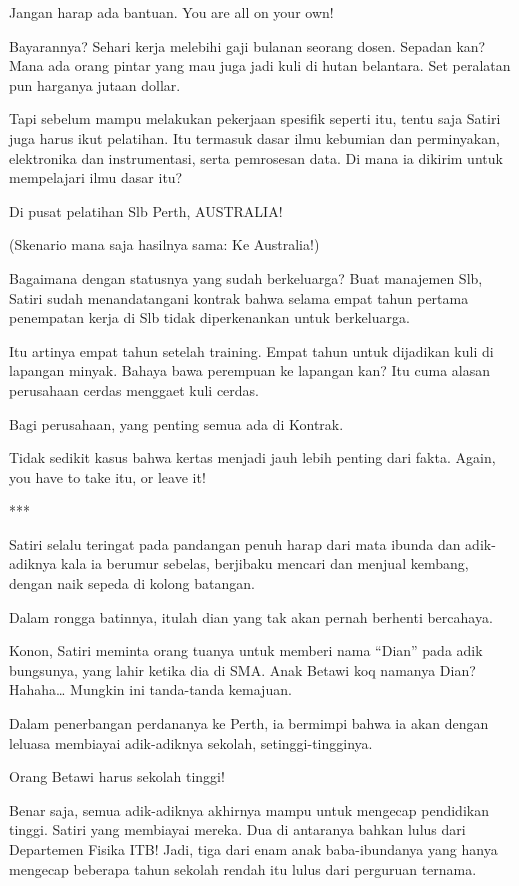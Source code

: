 Jangan harap ada bantuan. You are all on your own!

Bayarannya? Sehari kerja melebihi gaji bulanan seorang dosen. Sepadan kan? Mana ada orang pintar yang mau juga jadi kuli di hutan belantara. Set peralatan pun harganya jutaan dollar.

Tapi sebelum mampu melakukan pekerjaan spesifik seperti itu, tentu saja Satiri juga harus ikut pelatihan. Itu termasuk dasar ilmu kebumian dan perminyakan, elektronika dan instrumentasi, serta pemrosesan data. Di mana ia dikirim untuk mempelajari ilmu dasar itu?

Di pusat pelatihan Slb Perth, AUSTRALIA!

(Skenario mana saja hasilnya sama: Ke Australia!)

Bagaimana dengan statusnya yang sudah berkeluarga? Buat manajemen Slb, Satiri sudah menandatangani kontrak bahwa selama empat tahun pertama penempatan kerja di Slb tidak diperkenankan untuk berkeluarga.

Itu artinya empat tahun setelah training. Empat tahun untuk dijadikan kuli di lapangan minyak. Bahaya bawa perempuan ke lapangan kan? Itu cuma alasan perusahaan cerdas menggaet kuli cerdas.

Bagi perusahaan, yang penting semua ada di Kontrak.

Tidak sedikit kasus bahwa kertas menjadi jauh lebih penting dari fakta. Again, you have to take itu, or leave it!

***

Satiri selalu teringat pada pandangan penuh harap dari mata ibunda dan adik-adiknya kala ia berumur sebelas, berjibaku mencari dan menjual kembang, dengan naik sepeda di kolong batangan.

Dalam rongga batinnya, itulah dian yang tak akan pernah berhenti bercahaya.

Konon, Satiri meminta orang tuanya untuk memberi nama “Dian” pada adik bungsunya, yang lahir ketika dia di SMA. Anak Betawi koq namanya Dian? Hahaha… Mungkin ini tanda-tanda kemajuan.

Dalam penerbangan perdananya ke Perth, ia bermimpi bahwa ia akan dengan leluasa membiayai adik-adiknya sekolah, setinggi-tingginya.

Orang Betawi harus sekolah tinggi!

Benar saja, semua adik-adiknya akhirnya mampu untuk mengecap pendidikan tinggi. Satiri yang membiayai mereka. Dua di antaranya bahkan lulus dari Departemen Fisika ITB! Jadi, tiga dari enam anak baba-ibundanya yang hanya mengecap beberapa tahun sekolah rendah itu lulus dari perguruan ternama.

